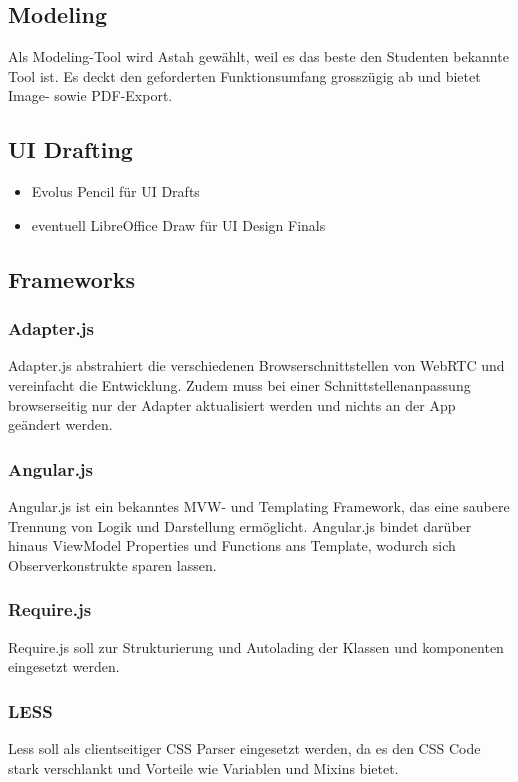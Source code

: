 \subsection{Modeling}
Als Modeling-Tool wird Astah gewählt, weil es das beste den Studenten
bekannte Tool ist.
Es deckt den geforderten Funktionsumfang grosszügig ab und bietet Image- sowie
PDF-Export.

\subsection{UI Drafting}
\begin{itemize}
	\setlength{\itemsep}{-\parsep}
	\item Evolus Pencil für UI Drafts
	\item eventuell LibreOffice Draw für UI Design Finals
\end{itemize}


\subsection{Frameworks}
\subsubsection{Adapter.js}
Adapter.js abstrahiert die verschiedenen Browserschnittstellen von WebRTC und vereinfacht die Entwicklung. Zudem muss bei einer Schnittstellenanpassung browserseitig nur der Adapter aktualisiert werden und nichts an der App geändert werden.

\subsubsection{Angular.js}
Angular.js ist ein bekanntes MVW- und Templating Framework, das eine saubere Trennung von Logik und Darstellung ermöglicht. Angular.js bindet darüber hinaus ViewModel Properties und Functions ans Template, wodurch sich Observerkonstrukte sparen lassen.

\subsubsection{Require.js}
Require.js soll zur Strukturierung und Autolading der Klassen und komponenten eingesetzt werden.

\subsubsection{LESS}
Less soll als clientseitiger CSS Parser eingesetzt werden, da es den CSS Code stark verschlankt und Vorteile wie Variablen und Mixins bietet.

